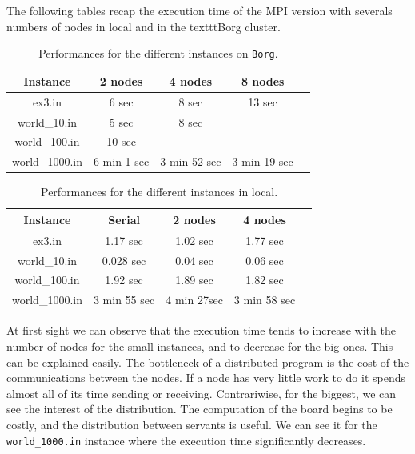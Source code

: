 \documentclass[a4paper,10pt]{article}
\begin{document}
The following tables recap the execution time of the MPI version with severals numbers of nodes in local and in the texttt{Borg} cluster.
\begin{table}[!ht]
\centering
\begin{tabular}{|c||c|c|c|c|}
  \hline
    Instance     &  2 nodes   & 4 nodes  & 8 nodes  \\
  \hline
    ex3.in       &    6 sec       & 8 sec       &  13 sec \\ 
  \hline
    world\_10.in &    5 sec      & 8 sec      &  \\ 
  \hline
   world\_100.in &    10 sec     &      &  \\ 
  \hline
  world\_1000.in &     6 min 1 sec   & 3 min 52 sec      & 3 min 19 sec  \\ 
  \hline
\end{tabular}
\caption{Performances for the different instances on \texttt{Borg}.}
\end{table}

\begin{table}[!ht]
\centering
\begin{tabular}{|c||c|c|c|c|}
  \hline
    Instance     & Serial   & 2 nodes   & 4 nodes   \\
  \hline
    ex3.in       &    1.17 sec   &  1.02 sec  & 1.77 sec  \\ 
  \hline
    world\_10.in &    0.028 sec   &  0.04 sec      & 0.06 sec   \\ 
  \hline
   world\_100.in &    1.92 sec   &   1.89 sec     &  1.82 sec   \\ 
  \hline
  world\_1000.in &    3 min 55 sec  &    4 min 27sec   & 3 min 58 sec   \\ 
  \hline
\end{tabular}
\caption{Performances for the different instances in local.}
\end{table}


At first sight we can observe that the execution time tends to increase with the number of nodes for the small instances, and
to decrease for the big ones. This can be explained easily. The bottleneck of a distributed program is the cost of the communications
between the nodes. If a node has very little work to do it spends almost all of its time sending or receiving.
Contrariwise, for the biggest, we can see the interest of the distribution. The computation of the board begins to be costly, and
the distribution between servants is useful. We can see it for the \texttt{world\_1000.in} instance where the execution time
significantly decreases.
\\
\end{document}
